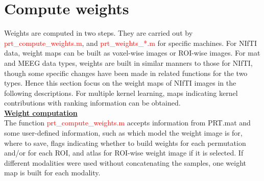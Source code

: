 



\section{Compute weights}


Weights are computed in two steps. They are carried out by \textcolor{red}{prt\_compute\_weights.m}, and \textcolor{red}{prt\_weights\_*.m} for specific machines. For NIfTI data, weight maps can be built as voxel-wise images or ROI-wise images. For mat and MEEG data types, weights are built in similar manners to those for NIfTI, though some specific changes have been made in related functions for the two types. Hence this section focus on the weight maps of NIfTI images in the following descriptions. For multiple kernel learning, maps indicating kernel contributions with ranking information can be obtained.
\\

\noindent \underline{\textbf{Weight computation}}
\\
 
The function \textcolor{red}{prt\_compute\_weights.m} accepts information from PRT.mat and some user-defined information, such as which model the weight image is for, where to save, flags indicating whether to build weights for each permutation and/or for each ROI, and atlas for ROI-wise weight image if it is selected. If different modalities were used without concatenating the samples, one weight map is built for each modality.
\\

